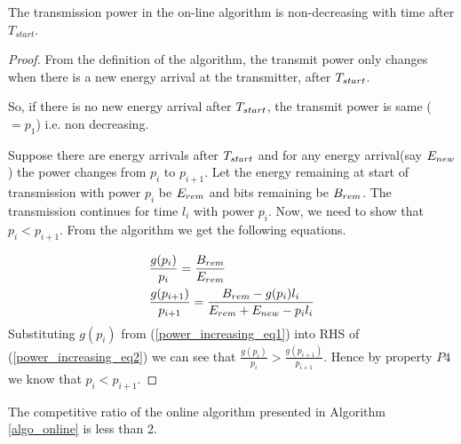 \begin{lemma}
The transmission power in the on-line algorithm is non-decreasing with time after $T_{start}$.
\label{online_power}
\end{lemma}
\begin{proof}
From the definition of the algorithm, the transmit power only changes when there is a new energy arrival at the transmitter, after $T_{\mbox{\scriptsize{start}}}$. 

So, if there is no new energy arrival after $T_{\mbox{\scriptsize{start}}}$, the transmit power is same ($=p_1$) i.e. non decreasing. 

Suppose there are energy arrivals after $T_{\mbox{\scriptsize{start}}}$ and for any energy arrival(say $E_{\mbox{\scriptsize{new}}}$) the power changes from $p_i$ to $p_{i+1}$. Let the energy remaining at start of transmission with power $p_i$ be $E_{\mbox{\scriptsize{rem}}}$ and bits remaining be $B_{\mbox{\scriptsize{rem}}}$. The transmission continues for time $l_i$ with power $p_i$. Now, we need to show that $p_i<p_{i+1}$. From the algorithm we get the following equations.  

\begin{align}
&\frac{g(p_i)}{p_i}=\frac{B_{\mbox{\scriptsize{rem}}}}{E_{\mbox{\scriptsize{rem}}}} \label{power_increasing_eq1}
\\
&\frac{g(p_{i+1})}{p_{i+1}}=\frac{B_{\mbox{\scriptsize{rem}}}-g(p_i) l_i}{E_{\mbox{\scriptsize{rem}}}+E_{\mbox{\scriptsize{new}}}-p_i l_i}\label{power_increasing_eq2}
\end{align}
Substituting $g(p_i)$ from (\ref{power_increasing_eq1}) into RHS of (\ref{power_increasing_eq2}) we can see that $\frac{g(p_i)}{p_i}>\frac{g(p_{i+1})}{p_{i+1}}$. Hence by property $P4$ we know that $p_i<p_{i+1}$.
\end{proof}
\begin{theorem}
The competitive ratio of the online algorithm presented in Algorithm \ref{algo_online} is less than 2.
\end{theorem}
